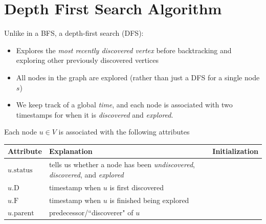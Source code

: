 \documentclass[11  pt]{exam}
\begin{document}
	
	
	
	\newpage 
	
	\section{Depth First Search Algorithm}
	Unlike in a BFS, a depth-first search (DFS):
	\begin{itemize}
		\item Explores the \emph{most recently discovered vertex} before backtracking and exploring other previously discovered vertices
		\item All nodes in the graph are explored (rather than just a DFS for a single node $s$)
		\item We keep track of a global \emph{time}, and each node is associated with two timestamps for when it is \emph{discovered} and \emph{explored}.
	\end{itemize}
	
	Each node $u \in V$ is associated with the following attributes
	
	\begin{tabular}{| l | p{8cm} | p{6cm} |}
		\hline
		Attribute & Explanation &Initialization \\
		\hline
		$u.\text{status}$ & tells us whether a node has been \emph{undiscovered}, \emph{discovered}, and \emph{explored} &  \\
		\hline
		$u.\text{D}$ & timestamp when $u$ is first discovered \phantom{the aa} \phantom{quick brown fox jumps over the lazy dog}
		\phantom{for more writing later on in the dell you know} &  \\
		\hline
		$u.\text{F}$ & timestamp when $u$ is finished being explored \phantom{the aa} \phantom{quick brown fox jumps over the lazy dog}
		\phantom{for more writing later on in the dell you know}  &  \\
		\hline
		$u.\text{parent}$ & predecessor/``discoverer" of $u$ \phantom{s a a a a a  here} \phantom{for more writing later on in the dell you know}& \\
		\hline
	\end{tabular}
	\newpage 
	
	
\end{document}
